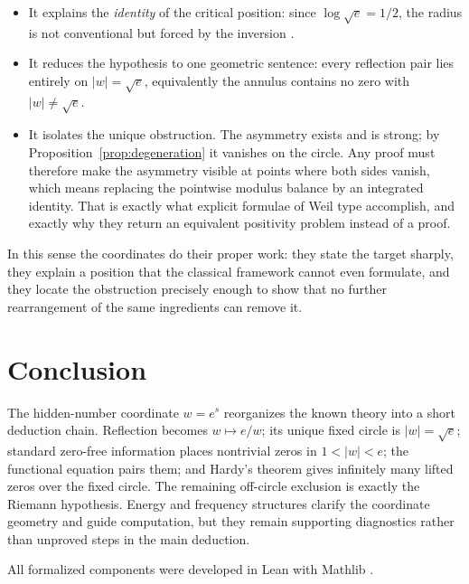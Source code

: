 \documentclass[submission,noinfoline]{jsfds}
\newcommand{\Lean}[1]{}
\newcommand{\abs}[1]{\lvert #1\rvert}
\begin{document}
\begin{itemize}
\item It explains the \emph{identity} of the critical position: since
$\log\sqrt e=1/2$, the radius is not conventional but forced by the
inversion \citep{LiuXu2026bridge}.
\item It reduces the hypothesis to one geometric sentence: every reflection
pair lies entirely on $\abs w=\sqrt e$, equivalently the annulus contains no
zero with $\abs w\neq\sqrt e$. \Lean{no_zero_off_circle}
\item It isolates the unique obstruction. The asymmetry exists and is strong;
by Proposition~\ref{prop:degeneration} it vanishes on the circle. Any proof
must therefore make the asymmetry visible at points where both sides vanish,
which means replacing the pointwise modulus balance by an integrated
identity. That is exactly what explicit formulae of Weil type accomplish, and
exactly why they return an equivalent positivity problem instead of a proof.
\end{itemize}

In this sense the coordinates do their proper work: they state the target
sharply, they explain a position that the classical framework cannot even
formulate, and they locate the obstruction precisely enough to show that no
further rearrangement of the same ingredients can remove it.

\section{Conclusion}\label{sec:conclusion}

The hidden-number coordinate $w=e^s$ reorganizes the known theory into a
short deduction chain. Reflection becomes $w\mapsto e/w$; its unique fixed
circle is $|w|=\sqrt e$; standard zero-free information places nontrivial
zeros in $1<|w|<e$; the functional equation pairs them; and Hardy's theorem
gives infinitely many lifted zeros over the fixed circle. The remaining off-circle
exclusion is exactly the Riemann hypothesis. Energy and frequency structures
clarify the coordinate geometry and guide computation, but they remain
supporting diagnostics rather than unproved steps in the main deduction.

All formalized components were developed in Lean \citep{deMoura2015} with
Mathlib \citep{MathlibCommunity2020}.


\end{document}
